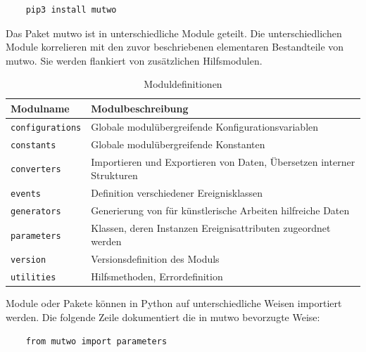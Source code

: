 \documentclass[12pt,a4paper,ngerman]{article}
\begin{document}
\lstset{language=bash}

\begin{lstlisting}
    pip3 install mutwo
\end{lstlisting}

Das Paket mutwo ist in unterschiedliche Module geteilt.
Die unterschiedlichen Module korrelieren mit den zuvor beschriebenen elementaren Bestandteile von mutwo.
Sie werden flankiert von zusätzlichen Hilfsmodulen.

\begin{table}[h!]
    \begin{center}
        \begin{tabular}{l l} 
            \hline
            Modulname & Modulbeschreibung \\ [0.5ex] 
            \hline\hline
            \texttt{configurations} & Globale modulübergreifende Konfigurationsvariablen \\
            \texttt{constants} & Globale modulübergreifende Konstanten \\
            \texttt{converters} & Importieren und Exportieren von Daten, Übersetzen interner Strukturen \\
            \texttt{events} & Definition verschiedener Ereignisklassen \\
            \texttt{generators} & Generierung von für künstlerische Arbeiten hilfreiche Daten \\
            \texttt{parameters} & Klassen, deren Instanzen Ereignisattributen zugeordnet werden \\
            \texttt{version} & Versionsdefinition des Moduls \\
            \texttt{utilities} & Hilfsmethoden, Errordefinition \\ [1ex] 
            \hline
        \end{tabular}\label{table:modulDefinition}
    \end{center}

    \caption{Moduldefinitionen}
\end{table}

Module oder Pakete können in Python auf unterschiedliche Weisen importiert werden.
Die folgende Zeile dokumentiert die in mutwo bevorzugte Weise:

\lstset{language=Python}

\begin{lstlisting}
    from mutwo import parameters
\end{lstlisting}
\end{document}
